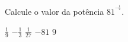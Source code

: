 Calcule o valor da potência $81^{^{-\frac{1}{2}}}$.

$\frac{1}{9}$
$-\frac{1}{3}$
$\frac{1}{27}$
$-81$
$9$


